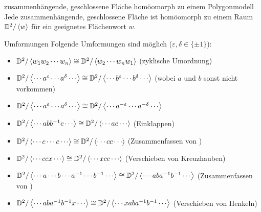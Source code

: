 \linie

\begin{Lemma}{zusammenhängende, geschlossene Fläche homöomorph
              zu einem Polygonmodell}\\
    Jede zusammenhängende, geschlossene Fläche ist homöomorph zu einem Raum
    $\mathbb{D}^2 / \left\langle{w}\right\rangle$ für ein geeignetes Flächenwort $w$.
\end{Lemma}

\begin{Lemma}{Umformungen}
    Folgende Umformungen sind möglich ($\varepsilon, \delta \in \{\pm 1\}$):
    \begin{itemize}
        \item
        $\mathbb{D}^2 / \left\langle{w_1 w_2 \dotsb w_n}\right\rangle \cong
        \mathbb{D}^2 / \left\langle{w_2 \dotsb w_n w_1}\right\rangle$
        (zyklische Umordnung)
        
        \item
        $\mathbb{D}^2 / \left\langle{\dotsb a^\varepsilon \dotsb
        a^\delta \dotsb}\right\rangle \cong
        \mathbb{D}^2 / \left\langle{\dotsb b^\varepsilon \dotsb
        b^\delta \dotsb}\right\rangle$
        (wobei $a$ und $b$ sonst nicht vorkommen)
        
        \item
        $\mathbb{D}^2 / \left\langle{\dotsb a^\varepsilon \dotsb
        a^\delta \dotsb}\right\rangle \cong
        \mathbb{D}^2 / \left\langle{\dotsb a^{-\varepsilon} \dotsb
        a^{-\delta} \dotsb}\right\rangle$
        
        \item
        $\mathbb{D}^2 / \left\langle{\dotsb a b b^{-1} c \dotsb}\right\rangle \cong
        \mathbb{D}^2 / \left\langle{\dotsb a c \dotsb}\right\rangle$
        (Einklappen)
        
        \item
        $\mathbb{D}^2 / \left\langle{\dotsb c \dotsb c \dotsb}\right\rangle \cong
        \mathbb{D}^2 / \left\langle{\dotsb c c \dotsb}\right\rangle$
        (Zusammenfassen von )
        
        \item
        $\mathbb{D}^2 / \left\langle{\dotsb c c x \dotsb}\right\rangle \cong
        \mathbb{D}^2 / \left\langle{\dotsb x c c \dotsb}\right\rangle$
        (Verschieben von Kreuzhauben)
        
        \item
        $\mathbb{D}^2 / \left\langle{\dotsb a \dotsb b \dotsb a^{-1}
        \dotsb b^{-1} \dotsb}\right\rangle \cong
        \mathbb{D}^2 / \left\langle{\dotsb a b a^{-1} b^{-1} \dotsb}\right\rangle$
        (Zusammenfassen von )
        
        \item
        $\mathbb{D}^2 / \left\langle{\dotsb a b a^{-1} b^{-1} x \dotsb}\right\rangle \cong
        \mathbb{D}^2 / \left\langle{\dotsb x a b a^{-1} b^{-1} \dotsb}\right\rangle$
        (Verschieben von Henkeln)
    \end{itemize}
\end{Lemma}

